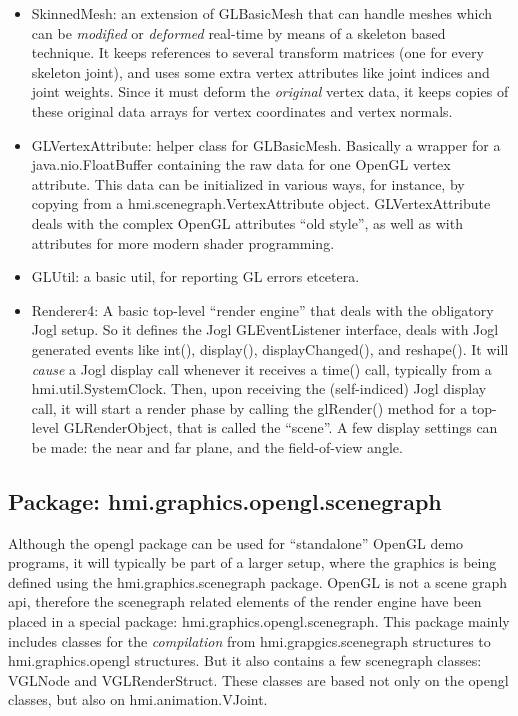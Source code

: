 \begin{itemize}
\item SkinnedMesh: an extension of GLBasicMesh that can handle meshes which can be
\emph{modified} or \emph{deformed} real-time by means of a skeleton based technique.
It keeps references to several transform matrices (one for every skeleton joint), and
uses some extra vertex attributes like joint indices and joint weights.
Since it must deform the \emph{original} vertex data, it keeps copies of these original
data arrays for vertex coordinates and vertex normals.

\item GLVertexAttribute: helper class for GLBasicMesh. Basically a wrapper for
a java.nio.FloatBuffer containing the raw data for one OpenGL vertex attribute.
This data can be initialized in various ways, for instance, by copying from a hmi.scenegraph.VertexAttribute object.
GLVertexAttribute deals with the complex OpenGL attributes ``old style'', as well as with attributes
for more modern shader programming.

\item GLUtil: a basic util, for reporting GL errors etcetera.

\item Renderer4: A basic top-level ``render engine'' that deals with the obligatory Jogl setup.
So it defines the Jogl GLEventListener interface, deals with Jogl generated events
like int(), display(), displayChanged(), and reshape(). It will \emph{cause} a Jogl display call
whenever it receives a time() call, typically  from a hmi.util.SystemClock. Then, upon receiving
the (self-indiced) Jogl display call, it will start a render phase by calling the glRender() method
for a top-level GLRenderObject, that is called the ``scene''.
A few display settings can be made: the near and far plane, and the field-of-view angle.

\end{itemize}

\subsection{Package: hmi.graphics.opengl.scenegraph}

Although the opengl package can be used for ``standalone'' OpenGL demo programs,
it will typically be part of a larger setup, where the graphics is being defined using
the hmi.graphics.scenegraph package. OpenGL is not a scene graph api, therefore the scenegraph related
elements of the render engine have been placed in a special package: hmi.graphics.opengl.scenegraph.
This package mainly includes classes for the \emph{compilation} from hmi.grapgics.scenegraph structures
to hmi.graphics.opengl structures. But it also contains a few scenegraph classes: VGLNode
and VGLRenderStruct. These classes are based not only on the opengl classes, but also on hmi.animation.VJoint.

